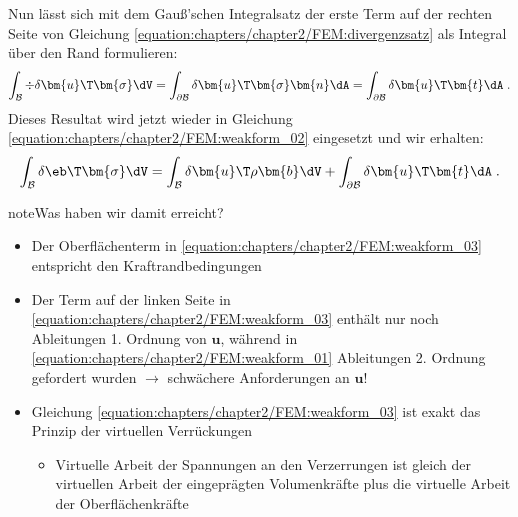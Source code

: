 \documentclass[letterpaper,10pt,german]{jupyterBook}
\begin{document}
\sphinxAtStartPar
Nun lässt sich mit dem Gauß’schen Integralsatz der erste Term auf der rechten Seite von Gleichung \eqref{equation:chapters/chapter2/FEM:divergenzsatz} als Integral über den Rand formulieren:
\begin{equation}\label{equation:chapters/chapter2/FEM:gaussIntegralTheorem}
\begin{split}\int_{\mathcal{B}} \div{\delta \bm{u}\T  \bm{\sigma}} \dV = \int_{\partial\mathcal{B}} \delta \bm{u}\T \bm{\sigma}  \bm{n} \dA = \int_{\partial\mathcal{B}} \delta \bm{u}\T \bm{t} \dA \; . \end{split}
\end{equation}
\sphinxAtStartPar
Dieses Resultat wird jetzt wieder in Gleichung \eqref{equation:chapters/chapter2/FEM:weakform_02} eingesetzt und wir erhalten:
\begin{equation}\label{equation:chapters/chapter2/FEM:weakform_03}
\begin{split}\int_{\mathcal{B}} \delta\eb\T  \bm{\sigma} \dV = \int_{\mathcal{B}} \delta \bm{u}\T \rho \bm{b} \dV + \int_{\partial\mathcal{B}} \delta \bm{u}\T  \bm{t} \dA \; .\end{split}
\end{equation}
\begin{sphinxadmonition}{note}{Was haben wir damit erreicht?}
\begin{itemize}
\item {} 
\sphinxAtStartPar
Der Oberflächenterm in \eqref{equation:chapters/chapter2/FEM:weakform_03} entspricht den Kraftrandbedingungen

\item {} 
\sphinxAtStartPar
Der Term auf der linken Seite in \eqref{equation:chapters/chapter2/FEM:weakform_03} enthält nur noch Ableitungen 1. Ordnung von \(\bm{u}\), während in \eqref{equation:chapters/chapter2/FEM:weakform_01} Ableitungen 2. Ordnung gefordert wurden \(\rightarrow\) schwächere Anforderungen an \(\bm{u}\)!

\item {} 
\sphinxAtStartPar
Gleichung \eqref{equation:chapters/chapter2/FEM:weakform_03} ist exakt das Prinzip der virtuellen Verrückungen
\begin{itemize}
\item {} 
\sphinxAtStartPar
Virtuelle Arbeit der Spannungen an den Verzerrungen ist gleich der virtuellen Arbeit der eingeprägten Volumenkräfte plus die virtuelle Arbeit der Oberflächenkräfte

\end{itemize}

\end{itemize}
\end{sphinxadmonition}
\end{document}

